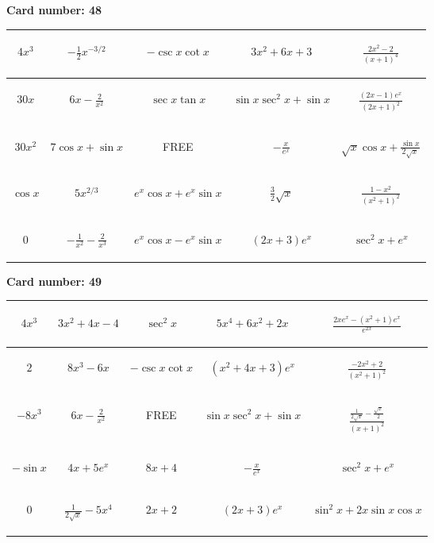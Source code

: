 \documentclass{article}
\newcommand{\entry}[1]{\begin{minipage}[t][2.75cm][t]{4cm} \vspace{1cm} \begin{center}#1\end{center} \end{minipage}}
\newcommand{\freespace}{\entry{FREE}}
\newcommand{\cardnumber}[1]{\noindent \textbf{Card number: #1} \bigskip}
\begin{document}
\pagebreak

\cardnumber{48}
\begin{center}
\begin{tabular}{|*{5}{c|}}
    \hline
    \entry{$4x^3$} & \entry{$-\frac{1}{2} x^{-3/2}$} & \entry{$-\csc x \cot x$} & \entry{$3x^2 + 6x + 3$} & \entry{$\frac{2x^2 - 2}{(x + 1)^4}$} \\ \hline
    \entry{$30x$} & \entry{$6x - \frac{2}{x^2}$} & \entry{$\sec x \tan x$} & \entry{$\sin x \sec^2 x + \sin x$} & \entry{$\frac{(2x - 1) e^x}{(2x + 1)^2}$} \\ \hline
    \entry{$30x^2$} & \entry{$7 \cos x + \sin x$} & \freespace & \entry{$-\frac{x}{e^x}$} & \entry{$\sqrt{x} \cos x + \frac{\sin x}{2 \sqrt{x}}$} \\ \hline
    \entry{$\cos x$} & \entry{$5x^{2/3}$} & \entry{$e^x \cos x + e^x \sin x$} & \entry{$\frac{3}{2} \sqrt{x}$} & \entry{$\frac{1 - x^2}{(x^2 + 1)^2}$} \\ \hline
    \entry{$0$} & \entry{$-\frac{1}{x^2} - \frac{2}{x^3}$} & \entry{$e^x \cos x - e^x \sin x$} & \entry{$(2x + 3) e^x$} & \entry{$\sec^2 x + e^x$} \\ \hline
\end{tabular}
\end{center}

\pagebreak

\cardnumber{49}
\begin{center}
\begin{tabular}{|*{5}{c|}}
    \hline
    \entry{$4x^3$} & \entry{$3x^2 + 4x - 4$} & \entry{$\sec^2 x$} & \entry{$5x^4 + 6x^2 + 2x$} & \entry{$\frac{2x e^x - (x^2 + 1) e^x}{e^{2x}}$} \\ \hline
    \entry{$2$} & \entry{$8x^3 - 6x$} & \entry{$-\csc x \cot x$} & \entry{$(x^2 + 4x + 3) e^x$} & \entry{$\frac{-2x^2 + 2}{(x^2 + 1)^2}$} \\ \hline
    \entry{$-8x^3$} & \entry{$6x - \frac{2}{x^2}$} & \freespace & \entry{$\sin x \sec^2 x + \sin x$} & \entry{$\frac{\frac{1}{2 \sqrt{x}} - \frac{\sqrt{x}}{2}}{(x + 1)^2}$} \\ \hline
    \entry{$-\sin x$} & \entry{$4x + 5e^x$} & \entry{$8x + 4$} & \entry{$-\frac{x}{e^x}$} & \entry{$\sec^2 x + e^x$} \\ \hline
    \entry{$0$} & \entry{$\frac{1}{2\sqrt{x}} - 5x^4$} & \entry{$2x + 2$} & \entry{$(2x + 3) e^x$} & \entry{$\sin^2 x + 2x \sin x \cos x$} \\ \hline
\end{tabular}
\end{center}
\end{document}
